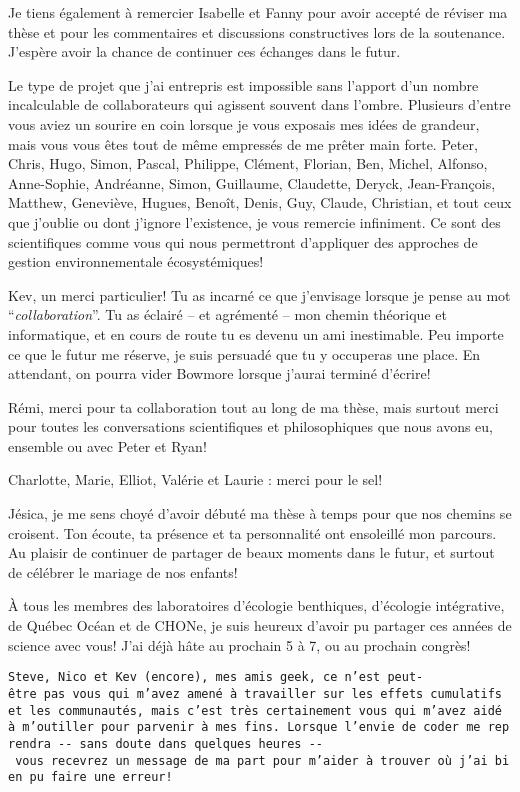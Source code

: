 Je tiens également à remercier Isabelle et Fanny pour avoir accepté de
réviser ma thèse et pour les commentaires et discussions constructives
lors de la soutenance. J'espère avoir la chance de continuer ces
échanges dans le futur.

Le type de projet que j'ai entrepris est impossible sans l'apport d'un
nombre incalculable de collaborateurs qui agissent souvent dans l'ombre.
Plusieurs d'entre vous aviez un sourire en coin lorsque je vous exposais
mes idées de grandeur, mais vous vous êtes tout de même empressés de me
prêter main forte. Peter, Chris, Hugo, Simon, Pascal, Philippe, Clément,
Florian, Ben, Michel, Alfonso, Anne-Sophie, Andréanne, Simon, Guillaume,
Claudette, Deryck, Jean-François, Matthew, Geneviève, Hugues, Benoît,
Denis, Guy, Claude, Christian, et tout ceux que j'oublie ou dont
j'ignore l'existence, je vous remercie infiniment. Ce sont des
scientifiques comme vous qui nous permettront d'appliquer des approches
de gestion environnementale écosystémiques!

Kev, un merci particulier! Tu as incarné ce que j'envisage lorsque je
pense au mot ``\emph{collaboration}''. Tu as éclairé -- et agrémenté --
mon chemin théorique et informatique, et en cours de route tu es devenu
un ami inestimable. Peu importe ce que le futur me réserve, je suis
persuadé que tu y occuperas une place. En attendant, on pourra vider
Bowmore lorsque j'aurai terminé d'écrire!

Rémi, merci pour ta collaboration tout au long de ma thèse, mais surtout
merci pour toutes les conversations scientifiques et philosophiques que
nous avons eu, ensemble ou avec Peter et Ryan!

Charlotte, Marie, Elliot, Valérie et Laurie : merci pour le sel!

Jésica, je me sens choyé d'avoir débuté ma thèse à temps pour que nos
chemins se croisent. Ton écoute, ta présence et ta personnalité ont
ensoleillé mon parcours. Au plaisir de continuer de partager de beaux
moments dans le futur, et surtout de célébrer le mariage de nos enfants!

À tous les membres des laboratoires d'écologie benthiques, d'écologie
intégrative, de Québec Océan et de CHONe, je suis heureux d'avoir pu
partager ces années de science avec vous! J'ai déjà hâte au prochain 5 à
7, ou au prochain congrès!

\texttt{Steve,\ Nico\ et\ Kev\ (encore),\ mes\ amis\ geek,\ ce\ n’est\ peut-être\ pas\ vous\ qui\ m’avez\ amené\ à\ travailler\ sur\ les\ effets\ cumulatifs\ et\ les\ communautés,\ mais\ c’est\ très\ certainement\ vous\ qui\ m’avez\ aidé\ à\ m’outiller\ pour\ parvenir\ à\ mes\ fins.\ Lorsque\ l’envie\ de\ coder\ me\ reprendra\ -\/-\ sans\ doute\ dans\ quelques\ heures\ -\/-\ vous\ recevrez\ un\ message\ de\ ma\ part\ pour\ m’aider\ à\ trouver\ où\ j’ai\ bien\ pu\ faire\ une\ erreur!}

